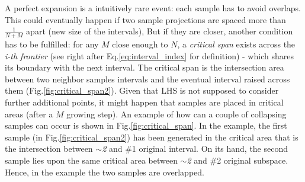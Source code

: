 \documentclass[12pt]{extarticle}
\newcommand{\meqref}[1]{Eq.\ref{#1}}
\newcommand{\mfigref}[1]{Fig.\ref{#1}}
\begin{document}
A perfect expansion is a intuitively rare event: each sample has to avoid overlaps. This could eventually happen if two sample projections are spaced more than $\frac{1}{N+M}$ apart (new size of the intervals), But if they are closer, another condition has to be fulfilled: for any $M$ close enough to $N$, a \textit{critical span} exists across the \textit{i-th frontier} (see right after \meqref{eq:interval_index} for definition) - which shares its boundary with the next interval. The critical span is the intersection area between two neighbor samples intervals and the eventual interval raised across them (\mfigref{fig:critical_span2}). Given that LHS is not supposed to consider further additional points, it might happen that samples are placed in critical areas (after a $M$ growing step). An example of how can a couple of collapsing samples can occur is shown in \mfigref{fig:critical_span}. In the example, the first sample (in \mfigref{fig:critical_span2}) has been generated in the critical area that is the intersection between \textit{$\sim$2} and \#1 original interval. On its hand, the second sample lies upon the same critical area between \textit{$\sim$2} and \#2 original subspace. Hence, in the example the two samples are overlapped.
\end{document}
